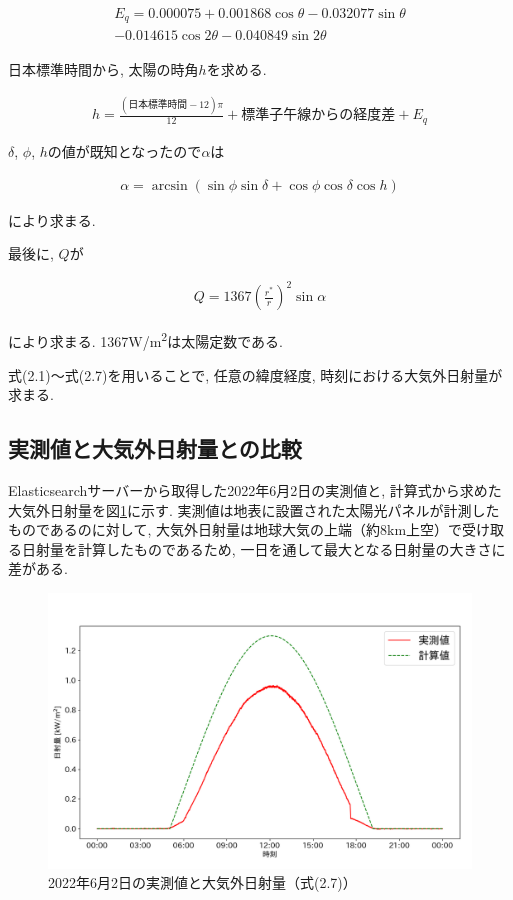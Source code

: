 \begin{eqnarray}
  \begin{split}
    E_q =  0.000075+0.001868\cos \theta-0.032077\sin \theta\\
    -0.014615\cos 2\theta-0.040849\sin 2\theta
  \end{split}
\end{eqnarray}

日本標準時間から, 太陽の時角$h$を求める.

\begin{eqnarray}
  h = \frac{(日本標準時間-12)\pi}{12}+標準子午線からの経度差+E_q
\end{eqnarray}

$\delta$, $\phi$, $h$の値が既知となったので$\alpha$は

\begin{eqnarray}
  \alpha = \arcsin (\sin \phi\sin \delta+\cos \phi\cos \delta\cos h)
\end{eqnarray}

により求まる.

最後に, $Q$が

\begin{eqnarray}
  Q = 1367(\frac{r^{*}}{r})^{2}\sin \alpha
\end{eqnarray}

により求まる. 1367\si{\watt}/\si{\metre\squared}は太陽定数である.

式(2.1)～式(2.7)を用いることで, 任意の緯度経度, 時刻における大気外日射量が求まる.


\subsection{実測値と大気外日射量との比較}
Elasticsearchサーバーから取得した2022年6月2日の実測値と, 計算式から求めた大気外日射量を図\ref{20220529-p1}に示す. 実測値は地表に設置された太陽光パネルが計測したものであるのに対して, 大気外日射量は地球大気の上端（約8km上空）で受け取る日射量を計算したものであるため, 一日を通して最大となる日射量の大きさに差がある.

\begin{figure}[H]
  \hspace*{-1cm}
  \centering
  \includegraphics[width=160mm]{sotu/figure/2/original-20220602-corr.png}
  \caption{2022年6月2日の実測値と大気外日射量（式(2.7)）}
  \label{20220529-p1}
\end{figure}

